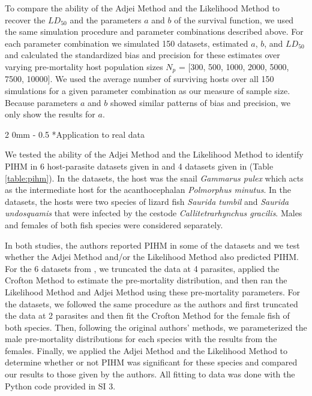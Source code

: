 \documentclass[12pt, a4paper]{article}
\makeatletter
\renewcommand{\subsection}{\@startsection
{subsection}%
{2}%
{0mm}%
{-\baselineskip}%
{0.5\baselineskip}%
{\normalfont\bf}} %
\makeatother
\begin{document}
To compare the ability of the Adjei Method and the Likelihood Method to recover the $LD_{50}$ and the parameters $a$ and $b$ of the survival function, we used the same simulation procedure and parameter combinations described above. For each parameter
combination we simulated 150 datasets, estimated $a$, $b$, and $LD_{50}$ and calculated the standardized bias and
precision \citep{Walther2005} for these estimates over varying pre-mortality host population sizes  $N_p$ = [300, 500, 1000, 2000, 5000, 7500,
10000]. We used the average number of surviving hosts over all 150 simulations for a given parameter combination as our measure of sample size.  Because parameters $a$ and $b$ showed similar patterns of bias and precision, we only show the results for $a$.

\subsection*{Application to real data}

We tested the ability of the Adjei Method and the Likelihood Method to identify
PIHM in 6 host-parasite datasets given in \cite{Crofton1971a} and 4 datasets
given in \cite{Adjei1986} (Table \ref{table:pihm}). In the \cite{Crofton1971a} datasets, the host was
the snail \emph{Gammarus pulex} which acts as the intermediate host for the
acanthocephalan \emph{Polmorphus minutus}. In the \cite{Adjei1986} datasets,
the hosts were two species of lizard fish \emph{Saurida tumbil} and
\emph{Saurida undosquamis} that were infected by the cestode
\emph{Callitetrarhynchus gracilis}.  Males and females of both fish species
were considered separately.

In both studies, the authors reported PIHM in some of the datasets and we test whether the Adjei
Method and/or the Likelihood Method also predicted PIHM. For the 6 datasets from
\cite{Crofton1971a}, we truncated the data at 4 parasites, applied the Crofton
Method to estimate the pre-mortality distribution, and then ran the Likelihood
Method and Adjei Method using these pre-mortality parameters.  For the
\cite{Adjei1986} datasets, we followed the same procedure as the authors and
first truncated the data at 2 parasites and then fit the Crofton Method for the
female fish of both species.  Then, following the original authors' methods, we parameterized the male pre-mortality
distributions for each species with the results from the females.  Finally, we
applied the Adjei Method and the Likelihood Method to determine whether or not
PIHM was significant for these species and compared our results to those given by the authors.  All fitting to data was done with the Python code provided in SI 3.
\end{document}
